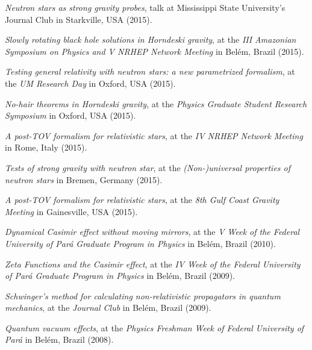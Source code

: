 \documentclass[10pt]{article}
\newcommand{\invited}{{\color{aeilbl}{invited}}}
\begin{document}
\begin{bibenum}
    \item
    \emph{Neutron stars as strong gravity probes},
    \invited{} talk at Mississippi State University's Journal Club
    in Starkville, USA (2015).

    \item
    \emph{Slowly rotating black hole solutions in Horndeski gravity},
    at the \emph{III Amazonian Symposium on Physics and V NRHEP Network Meeting}
    in Bel\'em, Brazil (2015).

    \item
    \emph{Testing general relativity with neutron stars: a new
    parametrized formalism},
    at the \emph{UM Research Day}
    in Oxford, USA (2015).

    \item
    \emph{No-hair theorems in Horndeski gravity},
    at the \emph{Physics Graduate Student Research Symposium}
    in Oxford, USA (2015).

    \item
    \emph{A post-TOV formalism for relativistic stars},
    at the \emph{IV NRHEP Network Meeting}
    in Rome, Italy (2015).

    \item
    \emph{Tests of strong gravity with neutron star},
    at the \emph{(Non-)universal properties of neutron stars}
    in Bremen, Germany (2015).

    \item
    \emph{A post-TOV formalism for relativistic stars},
    at the \emph{8th Gulf Coast Gravity Meeting}
    in Gainesville, USA (2015).

    \item
    \emph{Dynamical Casimir effect without moving mirrors},
    at the \emph{V Week of the Federal University of Par\'a Graduate Program in Physics}
    in Bel\'em, Brazil (2010).

    \item
    \emph{Zeta Functions and the Casimir effect},
    at the \emph{IV Week of the Federal University of Par\'a Graduate Program in Physics}
    in Bel\'em, Brazil (2009).

    \item
    \emph{Schwinger's method for calculating non-relativistic
    propagators in quantum mechanics},
    at the \emph{Journal Club}
    in Bel\'em, Brazil (2009).

    \item
    \emph{Quantum vacuum effects},
    at the \emph{Physics Freshman Week of Federal University of Par\'a}
    in Bel\'em, Brazil (2008).


\end{bibenum}
\end{document}
